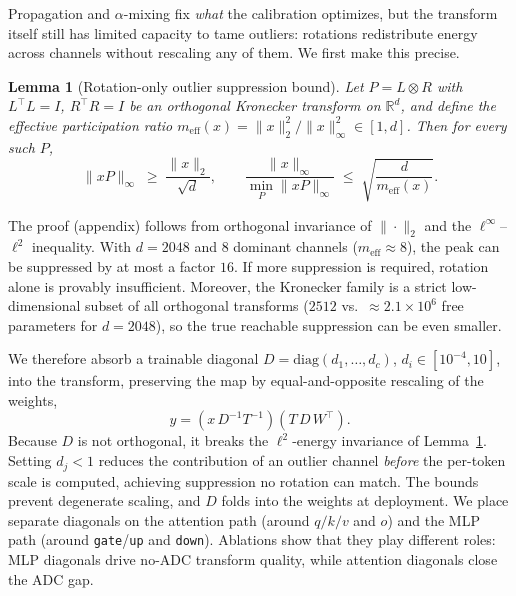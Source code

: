 \documentclass[letterpaper]{article} %
\theoremstyle{plain}
\newtheorem{lemma}{Lemma}
\begin{document}
Propagation and $\alpha$-mixing fix \emph{what} the calibration optimizes, but the transform itself still has limited capacity to tame outliers: rotations redistribute energy across channels without rescaling any of them. We first make this precise.

\begin{lemma}[Rotation-only outlier suppression bound]
\label{lem:rotation}
Let $P = L \otimes R$ with $L^\top L = I$, $R^\top R = I$ be an orthogonal Kronecker transform on $\mathbb{R}^d$, and define the effective participation ratio $m_{\mathrm{eff}}(x) = \|x\|_2^2 / \|x\|_\infty^2 \in [1, d]$. Then for every such $P$,
\begin{equation}
    \|xP\|_\infty \;\ge\; \frac{\|x\|_2}{\sqrt{d}},\qquad
    \frac{\|x\|_\infty}{\min_{P}\|xP\|_\infty} \;\le\; \sqrt{\frac{d}{m_{\mathrm{eff}}(x)}} .
\end{equation}
\end{lemma}

The proof (appendix) follows from orthogonal invariance of $\|\cdot\|_2$ and the $\ell^\infty$--$\ell^2$ inequality. With $d = 2048$ and $8$ dominant channels ($m_{\mathrm{eff}} \approx 8$), the peak can be suppressed by at most a factor $16$. If more suppression is required, rotation alone is provably insufficient. Moreover, the Kronecker family is a strict low-dimensional subset of all orthogonal transforms ($2512$ vs.\ $\approx 2.1\times10^6$ free parameters for $d=2048$), so the true reachable suppression can be even smaller.

We therefore absorb a trainable diagonal $D = \mathrm{diag}(d_1,\ldots,d_c)$, $d_i \in [10^{-4}, 10]$, into the transform, preserving the map by equal-and-opposite rescaling of the weights,
\begin{equation}
    y = (x\,D^{-1}T^{-1})(T\,D\,W^{\top}).
    \label{eq:diag}
\end{equation}
Because $D$ is not orthogonal, it breaks the $\ell^2$-energy invariance of Lemma~\ref{lem:rotation}. Setting $d_j < 1$ reduces the contribution of an outlier channel \emph{before} the per-token scale is computed, achieving suppression no rotation can match. The bounds prevent degenerate scaling, and $D$ folds into the weights at deployment. We place separate diagonals on the attention path (around $q/k/v$ and $o$) and the MLP path (around \texttt{gate}/\texttt{up} and \texttt{down}). Ablations show that they play different roles: MLP diagonals drive no-ADC transform quality, while attention diagonals close the ADC gap.
\end{document}
